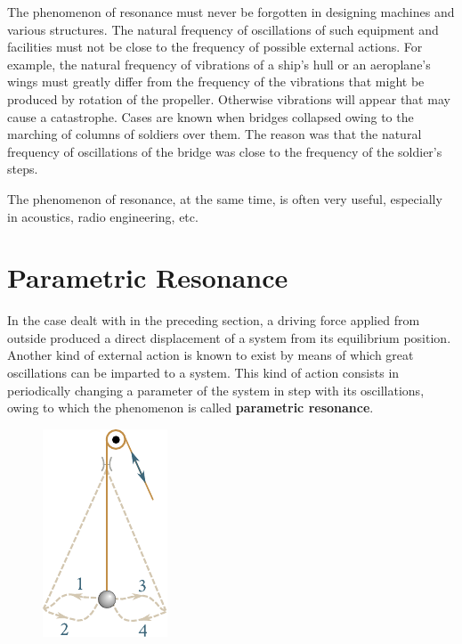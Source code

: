 The phenomenon of resonance must never be forgotten in designing machines and various structures. The natural frequency of oscillations of such equipment and facilities must not be close to the frequency of possible external actions. For example, the natural frequency of vibrations of a ship's hull or an aeroplane's wings must greatly differ from the frequency of the vibrations that might be produced by rotation of the propeller. Otherwise vibrations will appear that may cause a catastrophe. Cases are known when bridges collapsed owing to the marching of columns of soldiers over them. The reason was that the natural frequency of oscillations of the bridge was close to the frequency of the soldier's steps.

The phenomenon of resonance, at the same time, is often very useful, especially in acoustics, radio engineering, etc.

\section{Parametric Resonance}\label{sec:7_13}

In the case dealt with in the preceding section, a driving force applied from outside produced a direct displacement of a system from its equilibrium position. Another kind of external action is known to exist by means of which great oscillations can be imparted to a system. This kind of action consists in periodically changing a parameter of the system in step with its oscillations, owing to which the phenomenon is called \textbf{parametric resonance}.

\begin{figure}[t]
	\begin{center}
		\includegraphics[scale=0.95]{figures/ch_07/fig_7_26.pdf}
		\caption[]{}
		\label{fig:7_26}
	\end{center}
	\vspace{-0.8cm}
\end{figure}

